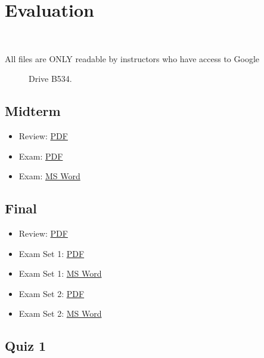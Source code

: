 \chapter{Evaluation}\label{evaluation}

\FILENAME\

\begin{description}
\item[All files are ONLY readable by instructors who have access to
Google]
Drive B534.
\end{description}

\section{Midterm}\label{midterm}

\begin{itemize}

\item
  Review:
  \href{https://drive.google.com/open?id=0B88HKpainTSfWGM1T1g1Tk1mYmM}{PDF}
\item
  Exam:
  \href{https://drive.google.com/open?id=0B88HKpainTSfS0syc1NEVDJjZDA}{PDF}
\item
  Exam:
  \href{https://drive.google.com/open?id=0B88HKpainTSfbXhROGptVi1iN1k}{MS
  Word}
\end{itemize}

\section{Final}\label{final}

\begin{itemize}

\item
  Review:
  \href{https://drive.google.com/open?id=0B88HKpainTSfRnV2WXZWbTNtLWc}{PDF}
\item
  Exam Set 1:
  \href{https://drive.google.com/open?id=0B88HKpainTSfWnVjVHpJTUFFYlU}{PDF}
\item
  Exam Set 1:
  \href{https://drive.google.com/open?id=0B88HKpainTSfNU1ldmItN3RIcUU}{MS
  Word}
\item
  Exam Set 2:
  \href{https://drive.google.com/open?id=0B88HKpainTSfTVZxMTZ4MC1sNFU}{PDF}
\item
  Exam Set 2:
  \href{https://drive.google.com/open?id=0B88HKpainTSfMGRzWDgtT1VDbEk}{MS
  Word}
\end{itemize}

\section{Quiz 1}\label{quiz-1}

